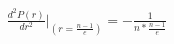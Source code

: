 \documentclass[preview]{standalone}
\begin{document}
\begin{align*}
\frac{d^{2}P(r)}{dr^{2}}|_{(r=\frac{n-1}{e})}=-\frac{1}{n*\frac{n-1}{e}}
\end{align*}
\end{document}
